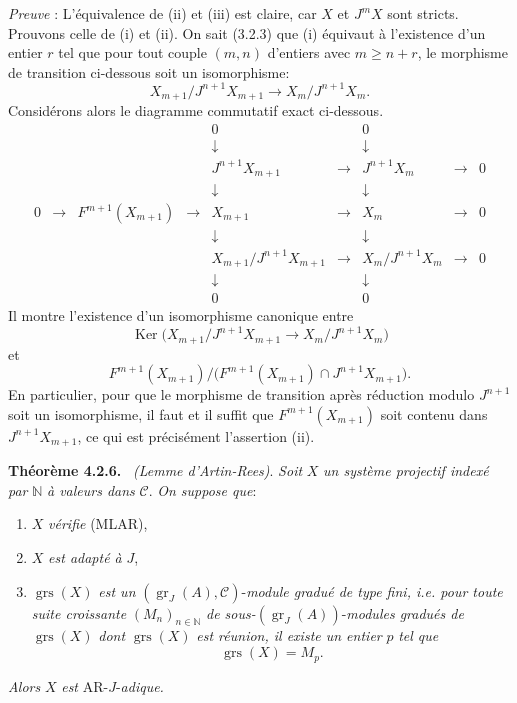 \documentclass[11pt]{article}
\newenvironment{statement}[1]{\par\medskip\noindent\textbf{#1.}\ }{\par\medskip}
\providecommand{\Ker}{\operatorname{Ker}}
\providecommand{\gr}{\operatorname{gr}}
\providecommand{\Ker}{\operatorname{Ker}}
\providecommand{\gr}{\operatorname{gr}}
\providecommand{\gr}{\operatorname{gr}}
\providecommand{\grs}{\operatorname{grs}}
\providecommand{\Ker}{\operatorname{Ker}}
\begin{document}
\emph{Preuve} : L'équivalence de (ii) et (iii) est claire, car \(X\) et \(J^mX\) sont stricts. Prouvons celle de (i) et (ii). On sait (3.2.3) que (i) équivaut à l'existence d'un entier \(r\) tel que pour tout couple \((m,n)\) d'entiers avec \(m\ge n+r\), le morphisme de transition ci-dessous soit un isomorphisme:
\[
X_{m+1}/J^{n+1}X_{m+1}\longrightarrow X_m/J^{n+1}X_m.
\]
Considérons alors le diagramme commutatif exact ci-dessous.
\[
\begin{array}{ccccccccccc}
&&&&0&&0\\
&&&&\downarrow&&\downarrow\\
&&&&J^{n+1}X_{m+1}&\longrightarrow&J^{n+1}X_m&\longrightarrow&0\\
&&&&\downarrow&&\downarrow\\
0&\longrightarrow&F^{m+1}(X_{m+1})&\longrightarrow&X_{m+1}&\longrightarrow&X_m&\longrightarrow&0\\
&&&&\downarrow&&\downarrow\\
&&&&X_{m+1}/J^{n+1}X_{m+1}&\longrightarrow&X_m/J^{n+1}X_m&\longrightarrow&0\\
&&&&\downarrow&&\downarrow\\
&&&&0&&0
\end{array}
\]
Il
montre l'existence d'un isomorphisme canonique entre
\[
\Ker\bigl(X_{m+1}/J^{n+1}X_{m+1}
       \longrightarrow X_m/J^{n+1}X_m\bigr)
\]
et
\[
F^{m+1}(X_{m+1})/
\bigl(F^{m+1}(X_{m+1})\cap J^{n+1}X_{m+1}\bigr).
\]
En particulier, pour que le morphisme de transition après réduction modulo \(J^{n+1}\) soit un isomorphisme, il faut et il suffit que \(F^{m+1}(X_{m+1})\) soit contenu dans \(J^{n+1}X_{m+1}\), ce qui est précisément l'assertion (ii).

\begin{statement}{Théorème 4.2.6}
\emph{(Lemme d'Artin-Rees)}. \emph{Soit} \(X\) \emph{un système projectif indexé par} \(\mathbb N\) \emph{à valeurs dans} \(\mathcal C\). \emph{On suppose que}:
\begin{enumerate}[label=\textup{(\roman*)}]
\item \(X\) \emph{vérifie} (MLAR),
\item \(X\) \emph{est adapté à} \(J\),
\item \(\grs(X)\) \emph{est un} \((\gr_J(A),\mathcal C)\)-\emph{module gradué de type fini, i.e. pour toute suite croissante} \((M_n)_{n\in\mathbb N}\) \emph{de sous-}\((\gr_J(A))\)-\emph{modules gradués de} \(\grs(X)\) \emph{dont} \(\grs(X)\) \emph{est réunion, il existe un entier} \(p\) \emph{tel que}
\[
\grs(X)=M_p.
\]
\end{enumerate}
\emph{Alors} \(X\) \emph{est} AR-\(J\)-\emph{adique.}
\end{statement}
\end{document}
